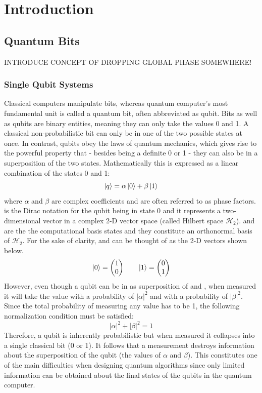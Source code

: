 \chapter{Introduction}\label{sec:introduction}

\section{Quantum Bits}
\label{subsec:qubits}

INTRODUCE CONCEPT OF DROPPING GLOBAL PHASE SOMEWHERE!

\subsection{Single Qubit Systems}
\label{subsubsec:qubits}
Classical computers manipulate bits, whereas quantum computer's most fundamental unit is called a quantum bit, often abbreviated as qubit. Bits as well as qubits are binary entities, meaning they can only take the values 0 and 1. A classical non-probabilistic bit can only be in one of the two possible states at once. In contrast, qubits obey the laws of quantum mechanics, which gives rise to the powerful property that - besides being a definite 0 or 1 - they can also be in a superposition of the two states. Mathematically this is expressed as a linear combination of the states 0 and 1:
\begin{equation}
\label{equ: simplequbit}
\ket{q} = \alpha \ket{0} + \beta \ket{1}
\end{equation}
where $\alpha$ and $\beta$ are complex coefficients and are often referred to as phase factors. \0 is the Dirac notation for the qubit being in state 0 and it represents a two-dimensional vector in a complex 2-D vector space (called Hilbert space $\mathcal{H}_{2}$). \0 and \1 are the the computational basis states and they constitute an orthonormal basis of $\mathcal{H}_{2}$. For the sake of clarity, \0 and \1 can be thought of as the 2-D vectors shown below.
\begin{equation}
\label{equ: 0and1kets}
\ket{0} =  \begin{pmatrix}1\\0\end{pmatrix} \quad \quad \ket{1} = \begin{pmatrix}0\\1\end{pmatrix}
\end{equation}
However, even though a qubit can be in as superposition of \0 and \1, when measured it will take the value \0 with a probability of ${|\alpha|}^{2}$ and \1 with a probability of ${|\beta|}^{2}$. Since the total probability of measuring any value has to be 1, the following normalization condition must be satisfied:
\begin{equation}
\label{equ: normalization}
{|\alpha|}^{2} + {|\beta|}^{2} =  1
\end{equation}
Therefore, a qubit is inherently probabilistic but when measured it collapses into a single classical bit (0 or 1). It follows that a measurement destroys information about the superposition of the qubit (the values of $\alpha$ and $\beta$). This constitutes one of the main difficulties when designing quantum algorithms since only limited information can be obtained about the final states of the qubits in the quantum computer.

